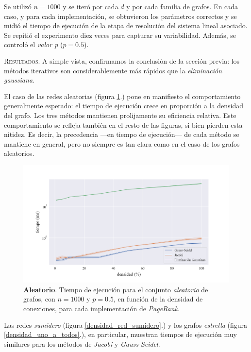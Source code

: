 Se utilizó $n = 1000$ y se iteró por cada $d$ y por cada familia de grafos. En cada caso, y para cada implementación, se obtuvieron los parámetros correctos y se midió el tiempo de ejecución de la etapa de resolución del sistema lineal asociado. Se repitió el experimento diez veces para capturar su variabilidad. Además, se controló el \textit{valor p} ($p = 0.5$).

\vspace{1.5em}
\noindent\textsc{Resultados}. A simple vista, confirmamos la conclusión de la sección previa: los métodos iterativos son considerablemente más rápidos que la \textit{eliminación gaussiana}.

\vspace{1em}
El caso de las redes aleatorias (figura \ref{densidad_aleatorio}.) pone en manifiesto el comportamiento generalmente esperado: 
el tiempo de ejecución crece en proporción a la densidad del grafo. Los tres métodos mantienen prolijamente su eficiencia relativa.
Este comportamiento se refleja también en el resto de las figuras, si bien pierden esta nitidez.
Es decir, la precedencia ---en tiempo de ejecución--- de cada método se mantiene en general, pero no siempre es tan clara como en el caso de los grafos aleatorios.

\begin{figure}[!htbp]
    \centering
    \includegraphics[width=.9\textwidth, trim=0 0 0 30]{files/src/.media/densidad_aleatorio.png}
    \caption{\textbf{Aleatorio}. Tiempo de ejecución para el conjunto \textit{aleatorio} de grafos, con $n = 1000$ y $p = 0.5$, en función de la densidad de conexiones, para cada implementación de \textit{PageRank}.}
    \label{densidad_aleatorio}
\end{figure}

\vspace{1em}
Las redes \textit{sumidero} (figura \ref{densidad_red_sumidero}.) y los grafos \textit{estrella} (figura \ref{densidad_uno_a_todos}.), en particular,
muestran tiempos de ejecución muy similares para los métodos de \textit{Jacobi} y \textit{Gauss-Seidel}.

